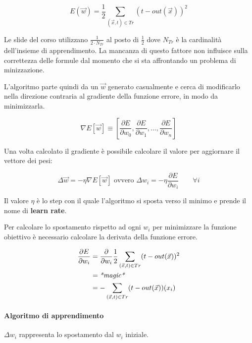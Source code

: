 $$
E(\vec{w}) = \frac{1}{2} \sum_{(\vec{x},t) \in Tr} (t - out(\vec{x}))^2
$$

Le slide del corso utilizzano $\frac{1}{2 \cdot N_{Tr}}$ al posto di $\frac{1}{2}$ dove $N_{Tr}$ è la cardinalità dell'insieme di apprendimento.
La mancanza di questo fattore non influisce sulla correttezza delle formule dal momento che si sta affrontando un problema di minizzazione.

L'algoritmo parte quindi da un $\vec{w}$ generato casualmente e cerca di modificarlo nella direzione contraria al gradiente della funzione errore, in modo da minimizzarla.

$$
\nabla E[\vec{w}] \equiv \left[ \frac{\partial E}{\partial w_0}, \frac{\partial E}{\partial w_1}, \ldots, \frac{\partial E}{\partial w_n}  \right] 
$$

Una volta calcolato il gradiente è possibile calcolare il valore per aggiornare il vettore dei pesi:

$$
\Delta\vec{w} = -\eta \nabla E[\vec{w}] \text{ ovvero } \Delta w_i = -\eta \frac{\partial E}{\partial w_i} \qquad \forall i
$$

Il valore $\eta$ è lo step con il quale l'algoritmo si sposta verso il minimo e prende il nome di
\textbf{learn rate}.

Per calcolare lo spostamento rispetto ad ogni $w_i$ per minimizzare
la funzione obiettivo è necessario calcolare la derivata della funzione errore. 

\begin{align*}
\frac{\partial E}{\partial w_i} &= \frac{\partial}{\partial w_i} \frac{1}{2} \sum_{(\vec{x},t) \in Tr} (t - out(\vec{x}))^2 \\
	&= \text{\textit{*magic*}} \\
	&= - \sum_{(\vec{x},t) \in Tr} (t - out(\vec{x}))(x_i) \\
\end{align*}

\paragraph{Algoritmo di apprendimento}\label{algoritmo-di-apprendimento}

$\Delta w_i$ rappresenta lo spostamento dal $w_i$ iniziale.

